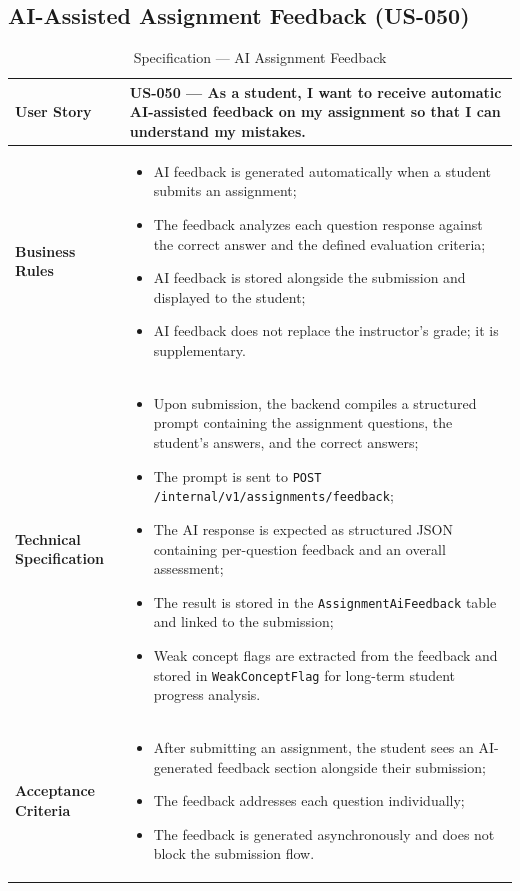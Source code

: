 \subsection{AI-Assisted Assignment Feedback (US-050)}

\begin{table}[H]
\centering
\caption{Specification — AI Assignment Feedback}
\label{tab:ai_feedback_spec}
\renewcommand{\arraystretch}{1.2}
\begin{tabularx}{\textwidth}{|p{3.5cm}|X|}
\hline
\textbf{User Story} & US-050 — As a student, I want to receive automatic AI-assisted feedback on my assignment so that I can understand my mistakes. \\
\hline
\textbf{Business Rules} &
\begin{itemize}[noitemsep, topsep=2pt]
  \item AI feedback is generated automatically when a student submits an assignment;
  \item The feedback analyzes each question response against the correct answer and
        the defined evaluation criteria;
  \item AI feedback is stored alongside the submission and displayed to the student;
  \item AI feedback does not replace the instructor's grade; it is supplementary.
\end{itemize} \\
\hline
\textbf{Technical Specification} &
\begin{itemize}[noitemsep, topsep=2pt]
  \item Upon submission, the backend compiles a structured prompt containing the
        assignment questions, the student's answers, and the correct answers;
  \item The prompt is sent to \texttt{POST /internal/v1/assignments/feedback};
  \item The AI response is expected as structured JSON containing per-question feedback
        and an overall assessment;
  \item The result is stored in the \texttt{AssignmentAiFeedback} table and linked
        to the submission;
  \item Weak concept flags are extracted from the feedback and stored in
        \texttt{WeakConceptFlag} for long-term student progress analysis.
\end{itemize} \\
\hline
\textbf{Acceptance Criteria} &
\begin{itemize}[noitemsep, topsep=2pt]
  \item After submitting an assignment, the student sees an AI-generated feedback
        section alongside their submission;
  \item The feedback addresses each question individually;
  \item The feedback is generated asynchronously and does not block the submission flow.
\end{itemize} \\
\hline
\end{tabularx}
\end{table}

